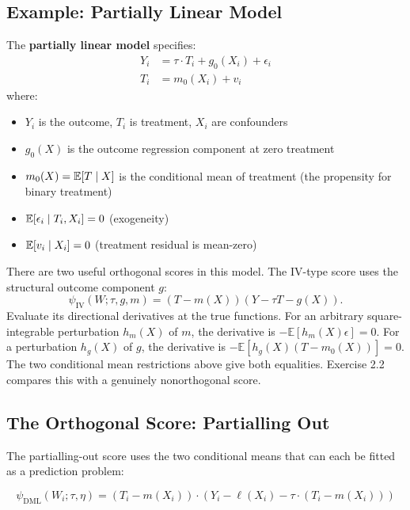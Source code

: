 \subsection{Example: Partially Linear
Model}\label{_example_partially_linear_model}

\begin{definition}
\label{def:partially_linear_model}
The \textbf{partially linear model} specifies:
\begin{align}
Y_i &= \tau \cdot T_i + g_0(X_i) + \epsilon_i \\
T_i &= m_0(X_i) + v_i
\end{align}
where:
\begin{itemize}
\item $Y_i$ is the outcome, $T_i$ is treatment, $X_i$ are confounders
\item $g_0(X)$ is the outcome regression component at zero treatment
\item $m_0(X) = \mathbb{E}[T \mid X]$ is the conditional mean of treatment (the propensity for binary treatment)
\item $\mathbb{E}[\epsilon_i \mid T_i, X_i] = 0$ (exogeneity)
\item $\mathbb{E}[v_i \mid X_i] = 0$ (treatment residual is mean-zero)
\end{itemize}
\end{definition}

There are two useful orthogonal scores in this model. The IV-type score uses the structural outcome component \(g\):
\[
\psi_{\mathrm{IV}}(W;\tau,g,m)=(T-m(X))(Y-\tau T-g(X)).
\]
Evaluate its directional derivatives at the true functions. For an arbitrary square-integrable perturbation \(h_m(X)\) of \(m\), the derivative is \(-\mathbb E[h_m(X)\epsilon]=0\). For a perturbation \(h_g(X)\) of \(g\), the derivative is \(-\mathbb E[h_g(X)(T-m_0(X))]=0\). The two conditional mean restrictions above give both equalities. Exercise 2.2 compares this with a genuinely nonorthogonal score.

\subsection{The Orthogonal Score: Partialling
Out}\label{_the_orthogonal_score_partialling_out}

The partialling-out score uses the two conditional means that can each be fitted as a prediction problem:

\[\psi_{\text{DML}}(W_i; \tau, \eta) = (T_i - m(X_i)) \cdot (Y_i - \ell(X_i) - \tau \cdot (T_i - m(X_i)))\]

